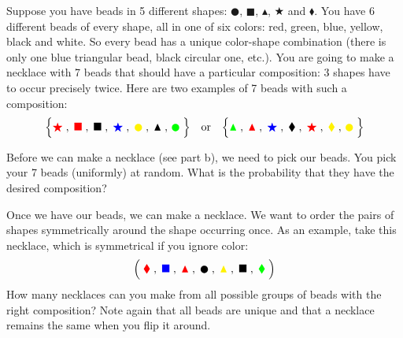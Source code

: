\documentclass[a4paper,10pt,landscape,twocolumn]{scrartcl}
\begin{document}
\begin{exercise}[Necklaces (4pt)]
  Suppose you have beads in 5 different shapes: $\CIRCLE$, $\blacksquare$,
  $\blacktriangle$, $\bigstar$ and $\blacklozenge$. You have 6 different beads
  of every shape, all in one of six colors: red, green, blue, yellow, black and
  white. So every bead has a unique color-shape combination (there is only one
  blue triangular bead, black circular one, etc.). You are going to make a
  necklace with 7 beads that should have a particular composition: 3 shapes
  have to occur precisely twice. Here are two examples of 7 beads with such a
  composition:
  \[
    \Bigr \{ {\color{red}\bigstar}
      \;, \; {\color{red} \blacksquare}
      \;, \; \blacksquare
      \;, \; {\color{blue}\bigstar}
      \;, \; {\color{yellow} \CIRCLE}
      \;, \; \blacktriangle
      \;, \, {\color{green}\CIRCLE}
     \; \Bigl\}
    \quad \mathrm{or} \quad
    \Bigr \{ {\color{green}\blacktriangle} 
      \;, \; {\color{red} \blacktriangle}
      \;, \; {\color{blue}\bigstar}
      \;,\; \blacklozenge
      \;, \; {\color{red}\bigstar}
      \;, \; {\color{yellow} \blacklozenge}
      \;, \, {\color{yellow}\CIRCLE} 
    \; \Bigl\}
  \]

  \begin{subex}[3pt]
    Before we can make a necklace (see part b), we need to pick our beads. You
    pick your 7 beads (uniformly) at random. What is the probability that they
    have the desired composition?
  \end{subex}

  \begin{subex}[1pt]
    Once we have our beads, we can make a necklace. We want to order the pairs
    of shapes symmetrically around the shape occurring once. As an example,
    take this necklace, which is symmetrical if you ignore color:
    \[	
      \Bigl (\; {\color{red}\blacklozenge}
        \;,\; {\color{blue}\blacksquare}
        \;,\; {\color{red}\blacktriangle}
        \;,\; {\color{black}\CIRCLE}
        \;,\; {\color{yellow}\blacktriangle}
        \;,\; {\color{black}\blacksquare}
        \;,\; {\color{green}\blacklozenge}
        \; \Bigr)
    \]
    How many necklaces can you make from all possible groups of beads with the
    right composition? Note again that all beads are unique and that a necklace
    remains the same when you flip it around.
  \end{subex}
\end{exercise}

\end{document}
